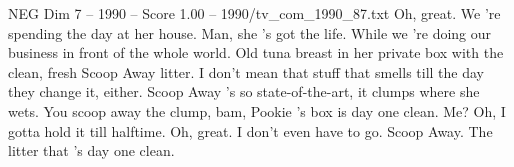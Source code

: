 \begin{textsample}{NEG Dim 7 – 1990 – Score 1.00 – 1990/tv\_com\_1990\_87.txt}  \label{ex:f7_neg_037}
Oh, great.
We 're spending the day at her house.
Man, she 's got the life.
While we 're doing our business in front of the whole world.
Old tuna breast in her private box with the clean, fresh Scoop Away litter.
I don't mean that stuff that smells till the day they change it, either.
Scoop Away 's so state-of-the-art, it clumps where she wets.
You scoop away the clump, bam, Pookie 's box is day one clean.
Me?
Oh, I gotta hold it till halftime.
Oh, great.
I don't even have to go.
Scoop Away.
The litter that 's day one clean.

\end{textsample}
